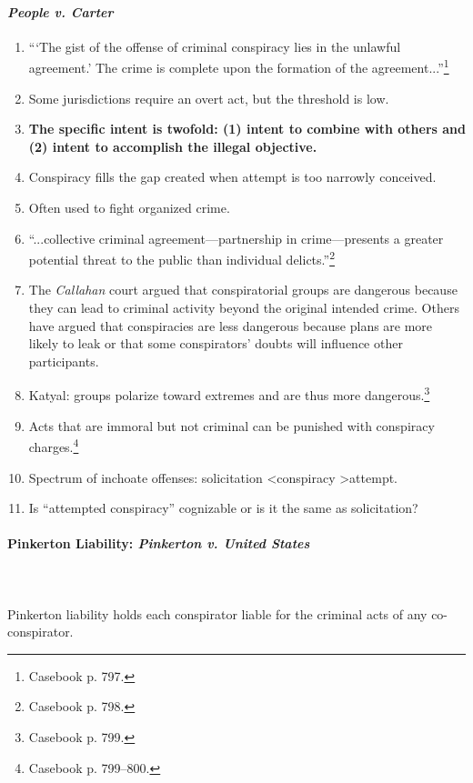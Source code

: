 \paragraph{\emph{People v. Carter}}

\begin{enumerate}
    \item ```The gist of the offense of criminal conspiracy lies in the 
    unlawful agreement.' The crime is complete upon the formation of the 
    agreement...''\footnote{Casebook p. 797.}
    \item Some jurisdictions require an overt act, but the threshold is low.
    \item \textbf{The specific intent is twofold: (1) intent to combine with 
    others and (2) intent to accomplish the illegal objective.}
    \item Conspiracy fills the gap created when attempt is too narrowly 
    conceived.
    \item Often used to fight organized crime.
    \item ``...collective criminal agreement---partnership in crime---presents 
    a greater potential threat to the public than individual 
    delicts.''\footnote{Casebook p. 798.}
    \item The \emph{Callahan} court argued that conspiratorial groups are 
    dangerous because they can lead to criminal activity beyond the original 
    intended crime. Others have argued that conspiracies are less dangerous 
    because plans are more likely to leak or that some conspirators' doubts 
    will influence other participants.
    \item Katyal: groups polarize toward extremes and are thus more 
    dangerous.\footnote{Casebook p. 799.}
    \item Acts that are immoral but not criminal can be punished with 
    conspiracy charges.\footnote{Casebook p. 799--800.}
    \item Spectrum of inchoate offenses: solicitation \textless conspiracy 
    \textgreater attempt.
    \item Is ``attempted conspiracy'' cognizable or is it the same as 
    solicitation?
\end{enumerate}

\paragraph{Pinkerton Liability: \emph{Pinkerton v. United States}}
~\\\\
Pinkerton liability holds each conspirator liable for the criminal acts of any 
co-conspirator.

